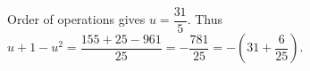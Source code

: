Order of operations gives $u=\dfrac{31}{5}$. Thus $u+1-u^2=\dfrac{155+25-961}{25}=-\dfrac{781}{25}=\boxed{-\left(31+\dfrac{6}{25}\right)}$.
